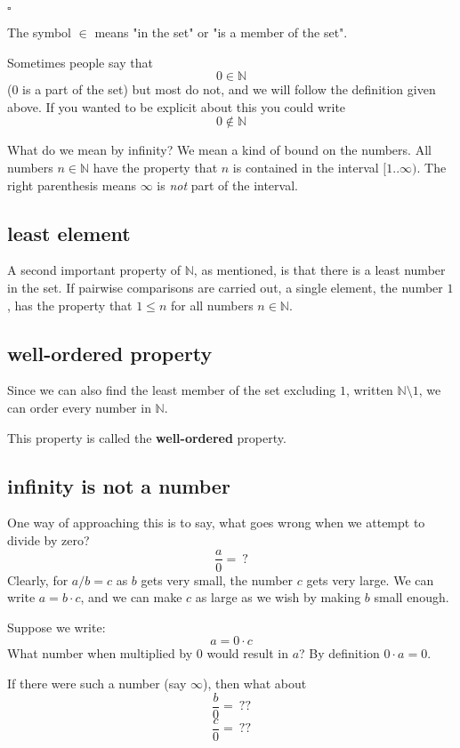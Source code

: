 \documentclass[11pt, oneside]{article}
\begin{document}
$\square$

The symbol $\in$ means "in the set" or "is a member of the set".

Sometimes people say that
\[ 0 \in \mathbb{N} \]
(0 is a part of the set) but most do not, and we will follow the definition given above.  If you wanted to be explicit about this you could write
\[ 0 \notin \mathbb{N} \]

What do we mean by infinity?  We mean a kind of bound on the numbers.  All numbers $n \in \mathbb{N}$ have the property that $n$ is contained in the interval $[1..\infty)$.  The right parenthesis means $\infty$ is \emph{not} part of the interval.

\subsection*{least element}

A second important property of $\mathbb{N}$, as mentioned, is that there is a least number in the set.  If pairwise comparisons are carried out, a single element, the number $1$, has the property that $1 \le n$ for all numbers $n \in \mathbb{N}$.

\subsection*{well-ordered property}

Since we can also find the least member of the set excluding $1$, written $\mathbb{N} \setminus 1$, we can order every number in $\mathbb{N}$.  

This property is called the \textbf{well-ordered} property.

\subsection*{infinity is not a number}

One way of approaching this is to say, what goes wrong when we attempt to divide by zero?
\[ \frac{a}{0} = \ ? \]
Clearly, for $a/b=c$ as $b$ gets very small, the number $c$ gets very large.  We can write $a = b \cdot c$, and we can make $c$ as large as we wish by making $b$ small enough.

Suppose we write:
\[ a = 0 \cdot c \]
What number when multiplied by $0$ would result in $a$?  By definition $0 \cdot a = 0$.  

If there were such a number (say $\infty$), then what about 
\[ \frac{b}{0} = \ ??  \]
\[ \frac{c}{0} = \ ??  \]
\end{document}
